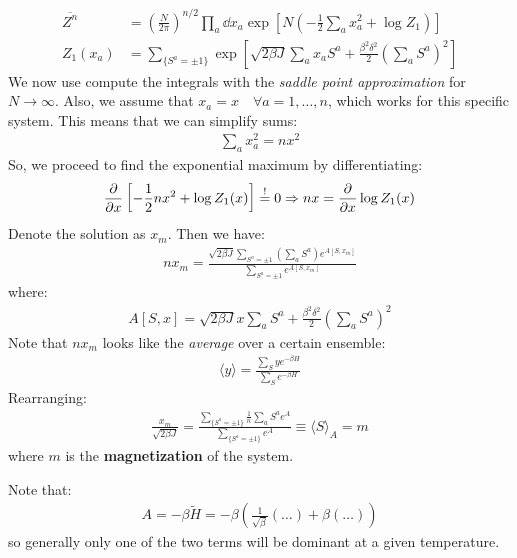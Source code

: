 \documentclass[../template.tex]{subfiles}
\begin{document}
\begin{align*}
    \overline{Z^n} &= \left(\frac{N}{2\pi} \right)^{n/2} \prod_a \dd{x_a} \exp \left[N\left(-\frac{1}{2} \sum_a x_a^2 + \log Z_1 \right)\right]\\
    Z_1(x_a) &= \sum_{\{S^a = \pm 1\}} \exp\left[\sqrt{2 \beta J} \sum_a x_a S^a + \frac{\beta^2 \delta^2}{2} \left(\sum_a S^a\right)^2 \right]
\end{align*}
We now use compute the integrals with the \textit{saddle point approximation} for $N \to \infty$. Also, we assume that $x_a = x \quad \forall a = 1, \dots, n$, which works for this specific system. This means that we can simplify sums:
\begin{align*}
    \sum_a x_a^2 = n x^2
\end{align*} 
So, we proceed to find the exponential maximum by differentiating:
\begin{align*}
    \pdv{x} \left[-\frac{1}{2} n x^2 + \log Z_1 (x) \right] \overset{!}{=}  0 \Rightarrow nx = \pdv{x} \log Z_1(x)
\end{align*}
Denote the solution as $x_m$. Then we have:
\begin{align*}
    n x_m = \frac{\displaystyle \sqrt{2 \beta J}\sum_{S^a = \pm 1} \left(\sum_a S^a\right) e^{A[S, x_m]}}{\displaystyle \sum_{S^a = \pm 1} e^{A[S, x_m]}}
\end{align*} 
where:
\begin{align*}
    A[S,x] = \sqrt{2 \beta J} x \sum_a S^a + \frac{\beta^2 \delta^2}{2} \left(\sum_a S^a\right)^2 
\end{align*}
Note that $n x_m$ looks like the \textit{average} over a certain ensemble:
\begin{align*}
    \langle y \rangle = \frac{\displaystyle \sum_S y e^{- \beta H}}{ \displaystyle \sum_S e^{- \beta H}} 
\end{align*}  
Rearranging:
\begin{align*}
    \frac{x_m}{\sqrt{2 \beta J}} = \frac{\displaystyle \sum_{\{S^a = \pm 1\}} \frac{1}{n} \sum_a S^a e^A }{\displaystyle \sum_{\{S^a = \pm 1\}} e^A} \equiv \langle S \rangle_A = m
\end{align*}
where $m$ is the \textbf{magnetization} of the system.   

Note that:
\begin{align*}
    A = - \beta \tilde{H} = - \beta\left(\frac{1}{\sqrt{\beta}} (\dots) + \beta(\dots) \right)
\end{align*}
so generally only one of the two terms will be dominant at a given temperature.
\end{document}
